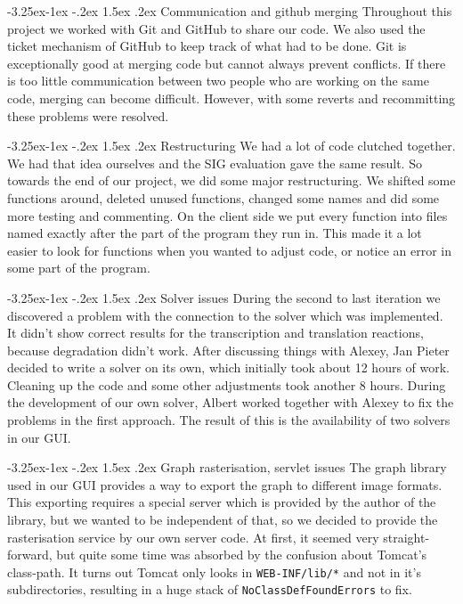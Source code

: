 \documentclass[a4paper]{article}
\makeatletter
\renewcommand\paragraph{\@startsection{paragraph}{4}{\z@}%
  {-3.25ex\@plus -1ex \@minus -.2ex}%
  {1.5ex \@plus .2ex}%
  {\normalfont\normalsize\bfseries}}
\makeatother
\begin{document}
\paragraph{Communication and github merging}
Throughout this project we worked with Git and GitHub to share our code. We also used the ticket mechanism of GitHub to keep track of what had to be done. Git is exceptionally good at merging code but cannot always prevent conflicts. If there is too little communication between two people who are working on the same code, merging can become difficult. However, with some reverts and recommitting these problems were resolved.

\paragraph{Restructuring}
We had a lot of code clutched together. We had that idea ourselves and the SIG evaluation gave the same result. So towards the end of our project, we did some major restructuring. We shifted some functions around, deleted unused functions, changed some names and did some more testing and commenting. On the client side we put every function into files named exactly after the part of the program they run in. This made it a lot easier to look for functions when you wanted to adjust code, or notice an error in some part of the program. 

\paragraph{Solver issues}
During the second to last iteration we discovered a problem with the connection to the solver which was implemented. It didn't show correct results for the transcription and translation reactions, because degradation didn't work. After discussing things with Alexey, Jan Pieter decided to write a solver on its own, which initially took about 12 hours of work. Cleaning up the code and some other adjustments took another 8 hours.
During the development of our own solver, Albert worked together with Alexey to fix the problems in the first approach. The result of this is the availability of two solvers in our GUI.

\paragraph{Graph rasterisation, servlet issues}
The graph library used in our GUI provides a way to export the graph to different image formats. This exporting requires a special server which is provided by the author of the library, but we wanted to be independent of that, so we decided to provide the rasterisation service by our own server code.
At first, it seemed very straight-forward, but quite some time was absorbed by the confusion about Tomcat's class-path. It turns out Tomcat only looks in \verb|WEB-INF/lib/*| and not in it's subdirectories, resulting in a huge stack of \verb|NoClassDefFoundErrors| to fix.
\end{document}
